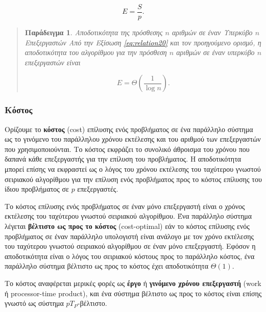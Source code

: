 \documentclass[12pt,a4paper]{article} %
\newtheorem{paradeigma}{Παράδειγμα}
\begin{document}
\begin{equation}
E = \frac{S}{p}.
\label{eq:relation21}
\end{equation}

\begin{quote}
\begin{paradeigma} \label{par:5} Αποδοτικότητα της πρόσθεσης $n$ αριθμών σε έναν Υπερκύβο $n$ Επεξεργαστών
Από την Εξίσωση \ref{eq:relation20} και τον προηγούμενο ορισμό, η 
αποδοτικότητα του αλγορίθμου για την πρόσθεση $n$ αριθμών σε έναν 
υπερκύβο $n$ επεξεργαστών είναι

\begin{equation}
E = \Theta \left(\frac{1}{\log n}\right).
\label{eq:relation22}
\end{equation}

\end{paradeigma}
\end{quote}

\subsubsection{Κόστος}
Ορίζουμε το \textbf{κόστος} ({cost}) επίλυσης 
ενός προβλήματος σε ένα παράλληλο σύστημα ως το γινόμενο του παράλληλου 
χρόνου εκτέλεσης και του αριθμού των επεξεργαστών που χρησιμοποιούνται. 
Το κόστος εκφράζει το συνολικό άθροισμα του χρόνου που δαπανά κάθε 
επεξεργαστής για την επίλυση του προβλήματος. Η αποδοτικότητα μπορεί επίσης 
να εκφραστεί ως ο λόγος του χρόνου εκτέλεσης του ταχύτερου γνωστού σειριακού 
αλγορίθμου για την επίλυση ενός προβλήματος προς το κόστος επίλυσης του 
ίδιου προβλήματος σε $p$ επεξεργαστές.

Το κόστος επίλυσης ενός προβλήματος σε έναν μόνο επεξεργαστή είναι ο χρόνος 
εκτέλεσης του ταχύτερου γνωστού σειριακού αλγορίθμου. Ένα παράλληλο σύστημα 
λέγεται \textbf{βέλτιστο ως προς το κόστος} (cost-optimal) 
εάν το κόστος επίλυσης ενός προβλήματος σε έναν παράλληλο υπολογιστή είναι 
ανάλογο με τον χρόνο εκτέλεσης του ταχύτερου γνωστού σειριακού αλγορίθμου 
σε έναν μόνο επεξεργαστή. Εφόσον η αποδοτικότητα είναι ο λόγος του σειριακού 
κόστους προς το παράλληλο κόστος, ένα παράλληλο σύστημα βέλτιστο ως προς το 
κόστος έχει αποδοτικότητα $\Theta(1)$.

Το κόστος αναφέρεται μερικές φορές ως \textbf{έργο} ή \textbf{γινόμενο χρόνου επεξεργαστή} 
(work ή processor-time product), 
και ένα σύστημα βέλτιστο ως προς το κόστος είναι επίσης γνωστό ως σύστημα $pT_P$-βέλτιστο.
\end{document}
